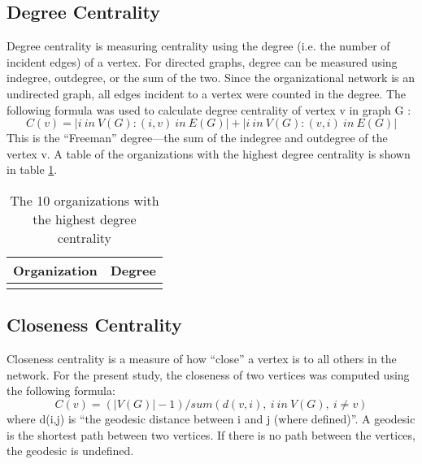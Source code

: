 \subsection{Degree Centrality}
Degree centrality is measuring centrality using the degree (i.e. the number of incident edges) of a vertex. For directed graphs, degree can be measured using indegree, outdegree, or the sum of the two. Since the organizational network is an undirected graph, all edges incident to a vertex were counted in the degree. The following formula was used to calculate degree centrality of vertex v in graph G : 
\begin{equation*}
C(v) = | {i\:in\:V(G) : (i,v)\:in\:E(G)} |+|{i\:in\:V(G) : (v,i)\:in\:E(G)}|
\end{equation*}
This is the ``Freeman'' degree---the sum of the indegree and outdegree of the vertex v. A table of the organizations with the highest degree centrality is shown in table \ref{tab:degree}.

\begin{table}
	\begin{tabular}{l|c}%
		\bfseries Organization & \bfseries Degree%
		\csvreader[head to column names]{degree.csv}{}%
		{\\\hline\organizationa & \scorea}%
	\end{tabular}
	\centering
	\caption{The 10 organizations with the highest degree centrality}\label{tab:degree}
\end{table}
\subsection{Closeness Centrality}
Closeness centrality is a measure of how ``close'' a vertex is to all others in the network. For the present study, the closeness of two vertices was computed using the following formula:
\begin{equation*}
	C(v) = (|V(G)|-1)/sum( d(v,i),\:i\:in\:V(G),\:i \neq v )
\end{equation*}
where d(i,j) is ``the geodesic distance between i and j (where defined)''\cite{butts}. A geodesic is the shortest path between two vertices. If there is no path between the vertices, the geodesic is undefined. 

